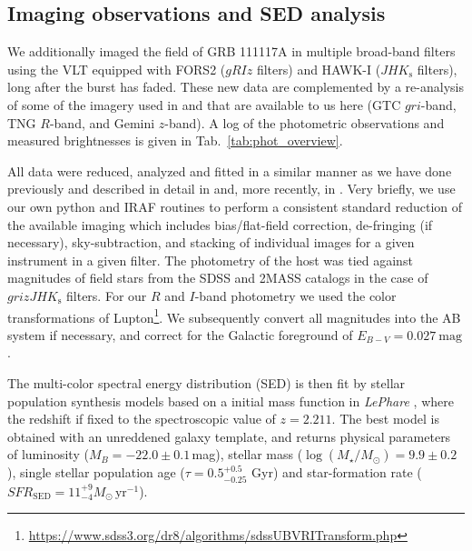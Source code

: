 \documentclass{aa}    %
\begin{document}


\subsection{Imaging observations and SED analysis} \label{SED}

We additionally imaged the field of GRB 111117A in multiple broad-band filters using the VLT equipped with FORS2 ($gRIz$ filters) and HAWK-I ($JHK_{\mathrm{s}}$ filters), long after the burst has faded. These new data are complemented by a re-analysis of some of the imagery used in \citet{Margutti2012} and \citet{Sakamoto2013} that are available to us here (GTC $gri$-band, TNG $R$-band, and Gemini $z$-band). A log of the photometric observations and measured brightnesses is given in Tab.~\ref{tab:phot_overview}.

All data were reduced, analyzed and fitted in a similar manner as we have done previously and described in detail in \citet{Kruhler2011a} and, more recently, in \citet{Schulze2016}. Very briefly, we use our own python and IRAF routines to perform a consistent standard reduction of the available imaging which includes bias/flat-field correction, de-fringing (if necessary), sky-subtraction, and stacking of individual images for a given instrument in a given filter. The photometry of the host was tied against magnitudes of field stars from the SDSS and 2MASS catalogs in the case of $grizJHK_{\mathrm{s}}$ filters. For our $R$ and $I$-band photometry we used the color transformations of Lupton\footnote{\url{https://www.sdss3.org/dr8/algorithms/sdssUBVRITransform.php}}. We subsequently convert all magnitudes into the AB system if necessary, and correct for the Galactic foreground of $E_{B-V}=0.027~\mathrm{mag}$.

The multi-color spectral energy distribution (SED) is then fit by \citet{Bruzual2003} stellar population synthesis models based on a \citet{Chabrier2003} initial mass function in \emph{LePhare} \citep{Ilbert2006}, where the redshift if fixed to the spectroscopic value of $z=2.211$. The best model is obtained with an unreddened galaxy template, and returns physical parameters of luminosity ($M_B=-22.0\pm0.1$\,mag), stellar mass ($\log(M_{\star}/M_\odot) = 9.9\pm0.2$), single stellar population age ($\tau = 0.5_{-0.25}^{+0.5}$ Gyr) and star-formation rate ($SFR_{\mathrm{SED}}=11_{-4}^{+9} M_\odot\,\mathrm{yr}^{-1}$). %
\end{document}
